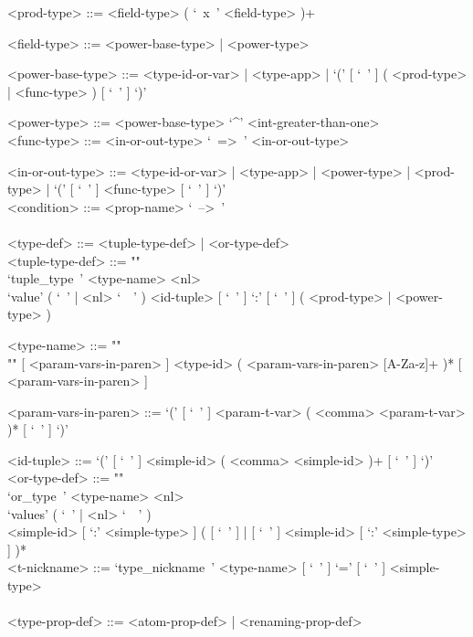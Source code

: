 \documentclass{article}
\begin{document}
\begin{grammar}
<prod-type> ::= <field-type> ( `\ x\ ' <field-type> )+

<field-type> ::= <power-base-type> | <power-type>

<power-base-type> ::=
<type-id-or-var> | <type-app> |
`(' [ `\ ' ] ( <prod-type> | <func-type> ) [ `\ ' ] `)'

<power-type> ::= <power-base-type> `^' <int-greater-than-one>
\\

<func-type> ::= <in-or-out-type> `\ =>\ ' <in-or-out-type>

<in-or-out-type> ::=
<type-id-or-var> | <type-app> | <power-type> | <prod-type> |
`(' [ `\ ' ] <func-type>  [ `\ ' ] `)'
\\

<condition> ::= <prop-name> `\ -->\ ' 
\\
\\

\newpage
<type-def> ::= <tuple-type-def> | <or-type-def>
\\

<tuple-type-def> ::= ""\\
`tuple_type\ ' <type-name> <nl> \\
`value' ( `\ ' | <nl> `\ \ ' )
<id-tuple> [ `\ ' ] `:' [ `\ ' ] ( <prod-type> | <power-type> )

<type-name> ::= ""\\""
[ <param-vars-in-paren> ] <type-id> ( <param-vars-in-paren> [A-Za-z]+ )*
[ <param-vars-in-paren> ]

<param-vars-in-paren> ::=
`(' [ `\ ' ] <param-t-var> ( <comma> <param-t-var> )* [ `\ ' ] `)'

<id-tuple> ::= `(' [ `\ ' ] <simple-id> ( <comma> <simple-id> )+ [ `\ ' ] `)'
\\

<or-type-def> ::= ""\\
`or_type\ ' <type-name> <nl> \\
`values' ( `\ ' | <nl> `\ \ ' ) \\ 
<simple-id> [ `:' <simple-type> ]
( [ `\ ' ] | [ `\ ' ] <simple-id> [ `:' <simple-type> ] )*
\\

<t-nickname> ::=
`type_nickname\ ' <type-name> [ `\ ' ] `=' [ `\ ' ] <simple-type>
\\\\

<type-prop-def> ::= <atom-prop-def> | <renaming-prop-def>
\\


\end{grammar}
\end{document}
